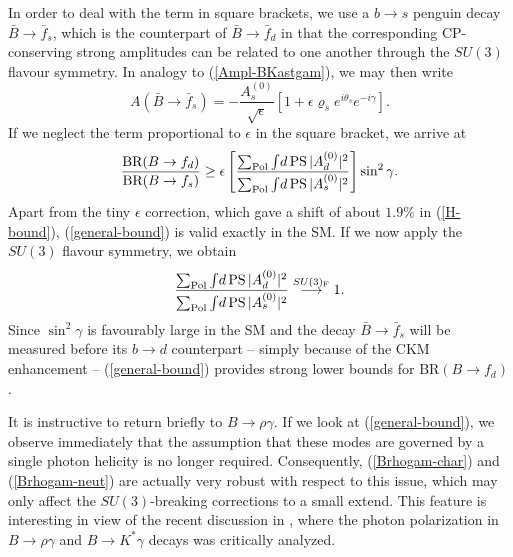 \documentclass[12pt]{article}
\begin{document}
In order to deal with the term in square brackets, we use a $b\to s$ 
penguin decay $\bar B \to \bar f_s$, which is the counterpart of $\bar B \to \bar f_d$ 
in that the corresponding CP-conserving strong amplitudes can be related
to one another through the $SU(3)$ flavour symmetry. In analogy to 
(\ref{Ampl-BKastgam}), we may then write
\begin{equation}
A(\bar B \to \bar f_s)= - \frac{A^{(0)}_s}{\sqrt{\epsilon}}
\left[1+\epsilon\varrho_s e^{i\theta_s}e^{-i\gamma}\right].
\end{equation}
If we neglect the term proportional to $\epsilon$ in the square bracket, 
we arrive at
\begin{equation}\label{general-bound}
\frac{\mbox{BR}(B \to f_d)}{\mbox{BR}(B \to f_s)}
\geq \epsilon \left[\frac{\sum_{\rm Pol}\int \! d \, {\rm PS} \, 
|A^{(0)}_d|^2 }{\sum_{\rm Pol}\int \! d \, {\rm PS} \, |A^{(0)}_s|^2 }
\right]\sin^2\gamma.
\end{equation}
Apart from the tiny $\epsilon$ correction, which gave a shift of about
$1.9\%$ in (\ref{H-bound}), (\ref{general-bound}) is valid
exactly in the SM. If we now apply the $SU(3)$ flavour symmetry, we obtain
\begin{equation}\label{SU3-limit}
\frac{\sum_{\rm Pol}\int \! d \, {\rm PS} \, 
|A^{(0)}_d|^2 }{\sum_{\rm Pol}\int \! d \, {\rm PS} \, |A^{(0)}_s|^2 }
\stackrel{SU(3)_{\rm F}}{\longrightarrow} 1.
\end{equation}
Since $\sin^2\gamma$ is favourably large in the SM and the decay
$\bar B \to \bar f_s$ will be measured before its $b\to d$ 
counterpart  -- simply because of the CKM enhancement -- 
(\ref{general-bound}) provides strong lower bounds for 
$\mbox{BR}(B \to f_d)$. 

It is instructive to return briefly to $B\to\rho\gamma$. If we look at 
(\ref{general-bound}), we observe immediately that the assumption that 
these modes are governed by a single photon helicity is no longer 
required. Consequently, (\ref{Brhogam-char}) and (\ref{Brhogam-neut}) 
are actually very robust with respect to this issue, which may only affect 
the $SU(3)$-breaking corrections to a small extend. This feature is interesting
in view of the recent discussion in \cite{GGLP}, where the photon polarization
in $B\to \rho\gamma$ and $B\to K^\ast \gamma$ decays was critically analyzed. 
\end{document}
